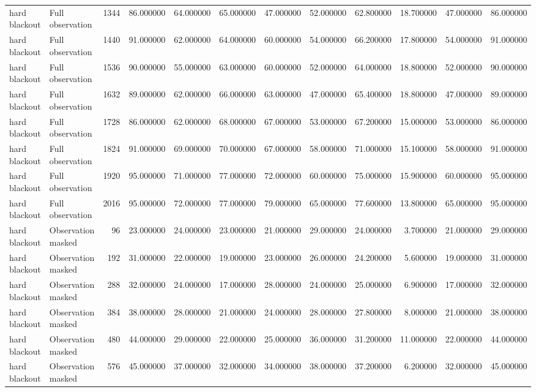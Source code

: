 \begin{tabular}{llrrrrrrrrrr}
hard blackout & Full observation & 1344 & 86.000000 & 64.000000 & 65.000000 & 47.000000 & 52.000000 & 62.800000 & 18.700000 & 47.000000 & 86.000000 \\
hard blackout & Full observation & 1440 & 91.000000 & 62.000000 & 64.000000 & 60.000000 & 54.000000 & 66.200000 & 17.800000 & 54.000000 & 91.000000 \\
hard blackout & Full observation & 1536 & 90.000000 & 55.000000 & 63.000000 & 60.000000 & 52.000000 & 64.000000 & 18.800000 & 52.000000 & 90.000000 \\
hard blackout & Full observation & 1632 & 89.000000 & 62.000000 & 66.000000 & 63.000000 & 47.000000 & 65.400000 & 18.800000 & 47.000000 & 89.000000 \\
hard blackout & Full observation & 1728 & 86.000000 & 62.000000 & 68.000000 & 67.000000 & 53.000000 & 67.200000 & 15.000000 & 53.000000 & 86.000000 \\
hard blackout & Full observation & 1824 & 91.000000 & 69.000000 & 70.000000 & 67.000000 & 58.000000 & 71.000000 & 15.100000 & 58.000000 & 91.000000 \\
hard blackout & Full observation & 1920 & 95.000000 & 71.000000 & 77.000000 & 72.000000 & 60.000000 & 75.000000 & 15.900000 & 60.000000 & 95.000000 \\
hard blackout & Full observation & 2016 & 95.000000 & 72.000000 & 77.000000 & 79.000000 & 65.000000 & 77.600000 & 13.800000 & 65.000000 & 95.000000 \\
hard blackout & Observation masked & 96 & 23.000000 & 24.000000 & 23.000000 & 21.000000 & 29.000000 & 24.000000 & 3.700000 & 21.000000 & 29.000000 \\
hard blackout & Observation masked & 192 & 31.000000 & 22.000000 & 19.000000 & 23.000000 & 26.000000 & 24.200000 & 5.600000 & 19.000000 & 31.000000 \\
hard blackout & Observation masked & 288 & 32.000000 & 24.000000 & 17.000000 & 28.000000 & 24.000000 & 25.000000 & 6.900000 & 17.000000 & 32.000000 \\
hard blackout & Observation masked & 384 & 38.000000 & 28.000000 & 21.000000 & 24.000000 & 28.000000 & 27.800000 & 8.000000 & 21.000000 & 38.000000 \\
hard blackout & Observation masked & 480 & 44.000000 & 29.000000 & 22.000000 & 25.000000 & 36.000000 & 31.200000 & 11.000000 & 22.000000 & 44.000000 \\
hard blackout & Observation masked & 576 & 45.000000 & 37.000000 & 32.000000 & 34.000000 & 38.000000 & 37.200000 & 6.200000 & 32.000000 & 45.000000 \\

\end{tabular}
